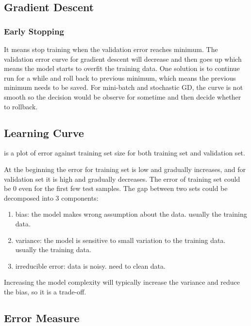 \subsection{Gradient Descent}

\subsubsection{Early Stopping}

It means stop training when the validation error reaches minimum. The validation error curve for gradient descent will decrease and then goes up which means the model starts to overfit the training data. One solution is to continue run for a while and roll back to previous minimum, which means the previous minimum needs to be saved. For mini-batch and stochastic GD, the curve is not smooth so the decision would be observe for sometime and then decide whether to rollback.




\subsection{Learning Curve}

 is a plot of error against training set size for both training set and validation set. 

At the beginning the error for training set is low and gradually increases, and for validation set it is high and gradually decreases. The error of training set could be $0$ even for the first few test samples. The gap between two sets could be decomposed into 3 components:
\begin{enumerate}
	\item bias: the model makes wrong assumption about the data. usually  the training data.
	\item variance: the model is sensitive to small variation to the training data. usually  the training data.
	\item irreducible error: data is noisy. need to clean data.
\end{enumerate}

Increasing the model complexity will typically increase the variance and reduce the bias, so it is a trade-off.






\subsection{Error Measure}

